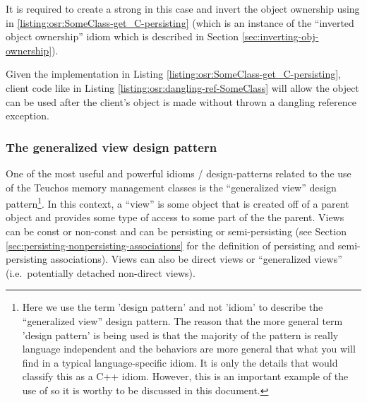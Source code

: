 \documentclass[pdf,ps2pdf,11pt]{SANDreport}
\begin{document}
It is required to create a strong {} in this case and
invert the object ownership using in
{}\ref{listing:osr:SomeClass-get_C-persisting} (which is an instance
of the ``inverted object ownership'' idiom which is described in
Section {}\ref{sec:inverting-obj-ownership}).

Given the implementation in Listing
{}\ref{listing:osr:SomeClass-get_C-persisting}, client code like in
Listing {}\ref{listing:osr:dangling-ref-SomeClass} will allow the
{} object can be used after the client's
{} object is made {} without
thrown a dangling reference exception.


%
{}\subsubsection{The generalized view design pattern}
\label{sec:generalized-view-design-pattern}
%

One of the most useful and powerful idioms / design-patterns related
to the use of the Teuchos memory management classes is the
``generalized view'' design pattern\footnote{Here we use the term
'design pattern' and not 'idiom' to describe the ``generalized view''
design pattern.  The reason that the more general term 'design
pattern' is being used is that the majority of the pattern is really
language independent and the behaviors are more general that what you
will find in a typical language-specific idiom.  It is only the
{} details that would classify this as a C++ idiom.  However,
this is an important example of the use of {} so it is worthy
to be discussed in this document.}.  In this context, a ``view'' is
some object that is created off of a parent object and provides some
type of access to some part of the the parent.  Views can be const or
non-const and can be persisting or semi-persisting (see Section
{}\ref{sec:persisting-nonpersisting-associations} for the definition
of persisting and semi-persisting associations).  Views can also be
direct views or ``generalized views'' (i.e.\ potentially detached
non-direct views).
\end{document}
